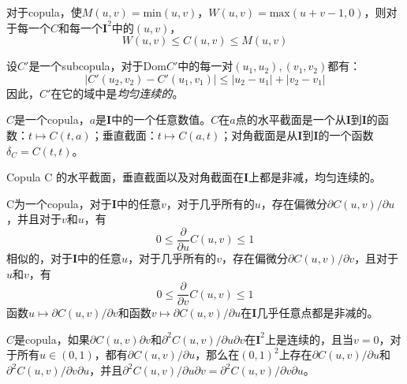 对于copula，使$M(u,v) = \text{min}(u,v)$，$W(u,v) = \text{max}(u+v-1,0)$，则对于每一个$C$和每一个$\mathbf{I}^2$中的$(u,v)$，
\begin{equation}
    W(u,v) \leq C(u,v) \leq M(u,v)
    \label{eq2.2.5}
\end{equation}
    
\begin{theorem}
    设$C'$是一个subcopula，对于Dom$C'$中的每一对$(u_1,u_2),(v_1,v_2)$都有：
    \begin{equation}
        \left|C'(u_2,v_2)-C'(u_1,v_1)\right| \leq \left|u_2-u_1\right|+\left|v_2-v_1\right|
        \label{eq-thr2.2.4}
    \end{equation}
    因此，$C'$在它的域中是\emph{\textcolor[rgb]{1,0,0}{均匀连续的}}。
    \label{thr2.2.4}
\end{theorem}
\begin{definition}
    $C$是一个copula，$a$是$\mathbf{I}$中的一个任意数值。$C$在$a$点的水平截面是一个从$\mathbf{I}$到$\mathbf{I}$的函数：$t \mapsto C(t,a)$；垂直截面：$t \mapsto C(a,t)$；对角截面是从$\mathbf{I}$到$\mathbf{I}$的一个函数$\delta_C = C(t,t)$。
    \label{def2.2.5}
\end{definition}
\begin{corollary}
    Copula C 的水平截面，垂直截面以及对角截面在$\mathbf{I}$上都是非减，均匀连续的。
    \label{coro2.2.6}
\end{corollary}

\begin{theorem}
    C为一个copula，对于$\mathbf{I}$中的任意$v$，对于几乎所有的$u$，存在偏微分$\partial C(u,v)/\partial u$，并且对于$v$和$u$，有
    \begin{equation}
        0 \leq \dfrac{\partial}{\partial u}C(u,v) \leq 1
        \label{eq2.2.7}
    \end{equation}
    相似的，对于$\mathbf{I}$中的任意$u$，对于几乎所有的$v$，存在偏微分$\partial C(u,v)/\partial v$，且对于$u$和$v$，有
    \begin{equation}
        0 \leq \dfrac{\partial}{\partial v}C(u,v) \leq 1
        \label{eq2.2.8}
    \end{equation}
    函数$u \mapsto \partial C(u,v)/\partial v$和函数$v \mapsto \partial C(u,v)/\partial u$在$\mathbf{I}$几乎任意点都是非减的。
    \label{thr2.2.7}
\end{theorem}

\begin{theorem}
    $C$是copula，如果$\partial C(u,v)\partial v$和$\partial^2 C(u,v)/\partial u\partial v$在$\mathbf{I}^2$上是连续的，且当$v=0$，对于所有$u \in (0,1)$，都有$\partial C(u,v)/\partial u$，那么在$(0,1)^2$上存在$\partial C(u,v)/\partial u$和$\partial^2C(u,v)/\partial v \partial u$，并且$\partial^2C(u,v)/\partial u \partial v = \partial^2C(u,v)/\partial v \partial u$。
    \label{thr2.2.8}
\end{theorem}

